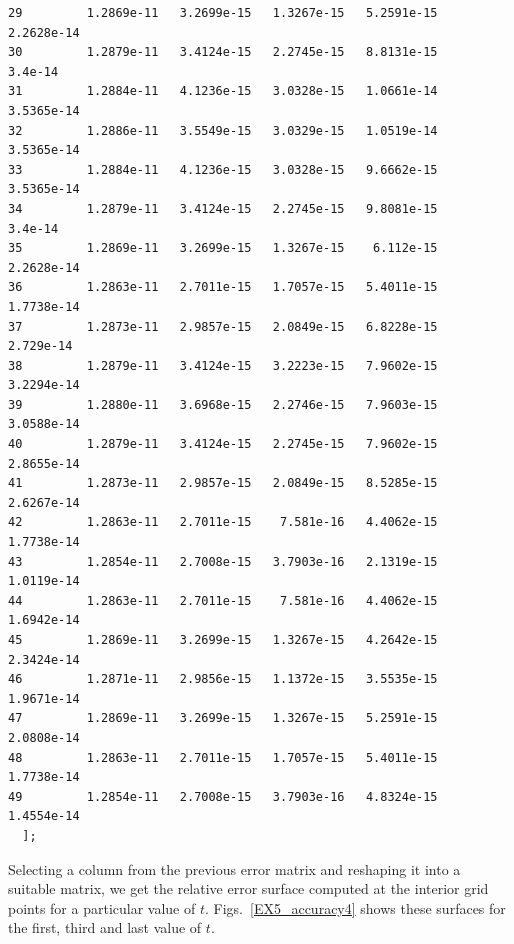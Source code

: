 \documentclass[a4paper,10pt]{report}%
\begin{document}
\begin{lstlisting}
29         1.2869e-11   3.2699e-15   1.3267e-15   5.2591e-15   2.2628e-14
30         1.2879e-11   3.4124e-15   2.2745e-15   8.8131e-15      3.4e-14
31         1.2884e-11   4.1236e-15   3.0328e-15   1.0661e-14   3.5365e-14
32         1.2886e-11   3.5549e-15   3.0329e-15   1.0519e-14   3.5365e-14
33         1.2884e-11   4.1236e-15   3.0328e-15   9.6662e-15   3.5365e-14
34         1.2879e-11   3.4124e-15   2.2745e-15   9.8081e-15      3.4e-14
35         1.2869e-11   3.2699e-15   1.3267e-15    6.112e-15   2.2628e-14
36         1.2863e-11   2.7011e-15   1.7057e-15   5.4011e-15   1.7738e-14
37         1.2873e-11   2.9857e-15   2.0849e-15   6.8228e-15    2.729e-14
38         1.2879e-11   3.4124e-15   3.2223e-15   7.9602e-15   3.2294e-14
39         1.2880e-11   3.6968e-15   2.2746e-15   7.9603e-15   3.0588e-14
40         1.2879e-11   3.4124e-15   2.2745e-15   7.9602e-15   2.8655e-14
41         1.2873e-11   2.9857e-15   2.0849e-15   8.5285e-15   2.6267e-14
42         1.2863e-11   2.7011e-15    7.581e-16   4.4062e-15   1.7738e-14
43         1.2854e-11   2.7008e-15   3.7903e-16   2.1319e-15   1.0119e-14
44         1.2863e-11   2.7011e-15    7.581e-16   4.4062e-15   1.6942e-14
45         1.2869e-11   3.2699e-15   1.3267e-15   4.2642e-15   2.3424e-14
46         1.2871e-11   2.9856e-15   1.1372e-15   3.5535e-15   1.9671e-14
47         1.2869e-11   3.2699e-15   1.3267e-15   5.2591e-15   2.0808e-14
48         1.2863e-11   2.7011e-15   1.7057e-15   5.4011e-15   1.7738e-14
49         1.2854e-11   2.7008e-15   3.7903e-16   4.8324e-15   1.4554e-14
  ];
\end{lstlisting}
Selecting a column from the previous error matrix and reshaping it into a suitable matrix, we get the relative error surface computed at the interior grid points for a particular value of $t$.
Figs.~\ref{EX5_accuracy4} shows these surfaces for the first, third and last value of $t$.
\end{document}

